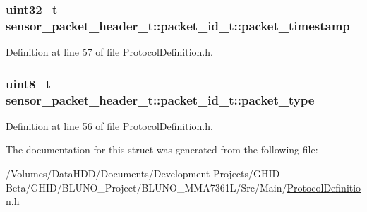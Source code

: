 \hypertarget{structsensor__packet__header__t_1_1packet__id__t_a1b3a838cb32f36a3e72a4322c6c37a8d}{
\subsubsection[{packet\-\_\-timestamp}]{\setlength{\rightskip}{0pt plus 5cm}uint32\-\_\-t {\bf sensor\-\_\-packet\-\_\-header\-\_\-t\-::packet\-\_\-id\-\_\-t\-::packet\-\_\-timestamp}}}\label{structsensor__packet__header__t_1_1packet__id__t_a1b3a838cb32f36a3e72a4322c6c37a8d}


\-Definition at line 57 of file \-Protocol\-Definition.\-h.

\hypertarget{structsensor__packet__header__t_1_1packet__id__t_a653b5259acc7c834d3afc90ee1abed8a}{
\subsubsection[{packet\-\_\-type}]{\setlength{\rightskip}{0pt plus 5cm}uint8\-\_\-t {\bf sensor\-\_\-packet\-\_\-header\-\_\-t\-::packet\-\_\-id\-\_\-t\-::packet\-\_\-type}}}\label{structsensor__packet__header__t_1_1packet__id__t_a653b5259acc7c834d3afc90ee1abed8a}


\-Definition at line 56 of file \-Protocol\-Definition.\-h.



\-The documentation for this struct was generated from the following file\-:\begin{DoxyCompactItemize}
\item 
/\-Volumes/\-Data\-H\-D\-D/\-Documents/\-Development Projects/\-G\-H\-I\-D -\/ Beta/\-G\-H\-I\-D/\-B\-L\-U\-N\-O\-\_\-\-Project/\-B\-L\-U\-N\-O\-\_\-\-M\-M\-A7361\-L/\-Src/\-Main/\hyperlink{_protocol_definition_8h}{\-Protocol\-Definition.\-h}\end{DoxyCompactItemize}
